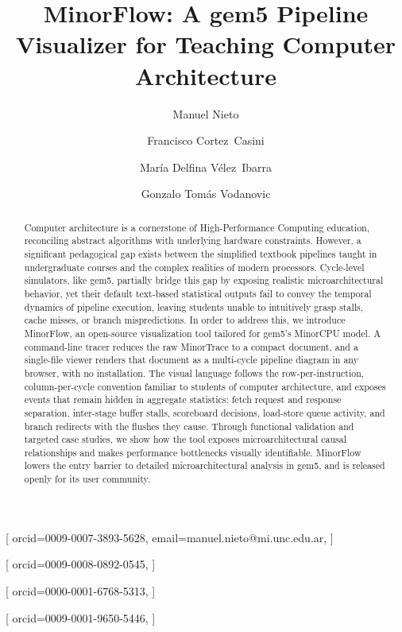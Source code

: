 \documentclass{ceurart}
\begin{document}


\title{MinorFlow: A gem5 Pipeline Visualizer for Teaching Computer Architecture}

\tnotemark[1]

\author[1]{Manuel Nieto}[%
orcid=0009-0007-3893-5628,
email=manuel.nieto@mi.unc.edu.ar,
]
\cormark[1]

\author[1]{Francisco {Cortez~Casini}}[%
orcid=0009-0008-0892-0545,
]

\author[1]{María Delfina {Vélez~Ibarra}}[%
orcid=0000-0001-6768-5313,
]

\author[1,2]{Gonzalo Tomás Vodanovic}[%
orcid=0009-0001-9650-5446,
]

\address[1]{Facultad de Matemática, Astronomía, Física y Computación, Universidad Nacional de Córdoba, Córdoba, Argentina}
\address[2]{Facultad Regional Villa María, Universidad Tecnológica Nacional, Villa María, Argentina}


\begin{abstract}
Computer architecture is a cornerstone of High-Performance Computing education, reconciling abstract algorithms with underlying hardware constraints. However, a significant pedagogical gap exists between the simplified textbook pipelines taught in undergraduate courses and the complex realities of modern processors. Cycle-level simulators, like gem5, partially bridge this gap by exposing realistic microarchitectural behavior, yet their default text-based statistical outputs fail to convey the temporal dynamics of pipeline execution, leaving students unable to intuitively grasp stalls, cache misses, or branch mispredictions. In order to address this, we introduce MinorFlow, an open-source visualization tool tailored for gem5's MinorCPU model. A command-line tracer reduces the raw MinorTrace to a compact document, and a single-file viewer renders that document as a multi-cycle pipeline diagram in any browser, with no installation. The visual language follows the row-per-instruction, column-per-cycle convention familiar to students of computer architecture, and exposes events that remain hidden in aggregate statistics: fetch request and response separation, inter-stage buffer stalls, scoreboard decisions, load-store queue activity, and branch redirects with the flushes they cause. Through functional validation and targeted case studies, we show how the tool exposes microarchitectural causal relationships and makes performance bottlenecks visually identifiable. MinorFlow lowers the entry barrier to detailed microarchitectural analysis in gem5, and is released openly for its user community.
\end{abstract}
\end{document}
